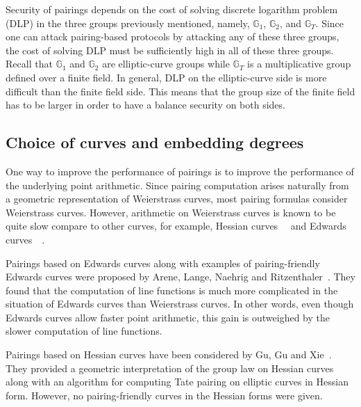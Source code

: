 Security of pairings depends on the cost of solving discrete logarithm problem (DLP) in the three groups previously mentioned,
namely, $\mathbb{G}_1$, $\mathbb{G}_2$, and $\mathbb{G}_T$.
Since one can attack pairing-based protocols by attacking any of these three groups,
the cost of solving DLP must be sufficiently high in all of these three groups.
Recall that $\mathbb{G}_1$ and $\mathbb{G}_2$ are elliptic-curve groups
while $\mathbb{G}_T$ is a multiplicative group defined over a finite field.
In general, DLP on the elliptic-curve side is more difficult than the finite field side.
This means that the group size of the finite field has to be larger in order to have a balance security on both sides.


\subsection{Choice of curves and embedding degrees}

One way to improve the performance of pairings is
to improve the performance of the underlying point arithmetic.
Since pairing computation arises naturally from a geometric representation of Weierstrass curves,
most pairing formulas consider Weierstrass curves.
However, arithmetic on Weierstrass curves is known to be quite slow compare to other curves,
for example, Hessian curves~\cite{2001/smart}~\cite{2001/joye} and
Edwards curves~\cite{2007/edwards}~\cite{2007/bernstein-newelliptic}.

Pairings based on Edwards curves
along with examples of pairing-friendly Edwards curves
were proposed by Arene, Lange, Naehrig and Ritzenthaler~\cite{2009/fastertate}.
They found that the computation of line functions is much more complicated in the situation of Edwards curves than Weierstrass curves.
In other words,
even though Edwards curves allow faster point arithmetic,
this gain is outweighed by the slower computation of line functions.

Pairings based on Hessian curves have been considered by Gu, Gu and Xie~\cite{2010/Gu}.
They provided a geometric interpretation of the group law on Hessian curves
along with an algorithm for computing Tate pairing on elliptic curves in Hessian form.
However, no pairing-friendly curves in the Hessian forms were given.

